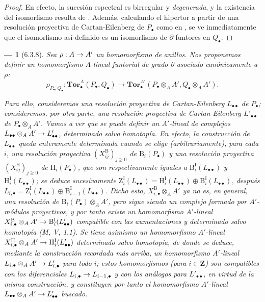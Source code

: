 \documentclass[10pt,oneside,openany]{book}
\theoremstyle{egaenv}\newtheorem*{env}{---}
\theoremstyle{egastatement}
\theoremstyle{egadescription}
\newcommand{\oldpage}[2][]{\marginnote{\normalfont\scriptsize\textbf{#1}\,|\,#2}\ignorespaces}
\renewcommand{\to}{\mathchoice{\longrightarrow}{\rightarrow}{\rightarrow}{\rightarrow}}
\begin{document}
\begin{proof}
En efecto, la sucesión espectral  es birregular y
\emph{degenerada}, y la existencia del isomorfismo  resulta de
. Además,
calculando el hipertor a partir de una resolución proyectiva de
Cartan-Eilenberg de $P_\bullet$ como en , se ve
inmediatamente que el
isomorfismo así definido es un isomorfismo de $\partial$-funtores en
$Q_\bullet$.
\end{proof}
\begin{env}[6.3.8]
\label{III.6.3.8}
\oldpage[III]{144}
Sea $\rho:A\to A'$ un homomorfismo de anillos. Nos proponemos definir un
homomorfismo $A$-lineal funtorial de grado 0 asociado canónicamente a $\rho$:
\[
  \rho_{P_\bullet,Q_\bullet}:
  \mathbf{Tor}_\bullet^A(P_\bullet,Q_\bullet)
  \longrightarrow
  \mathbf{Tor}_\bullet^{A'}
  (P_\bullet\otimes_A A',Q_\bullet\otimes_A A').
  \tag{6.3.8.1}\label{III.6.3.8.1.fr}
\]

Para ello, consideremos una resolución \emph{proyectiva} de Cartan-Eilenberg
$L_{\bullet\bullet}$ de $P_\bullet$; consideremos, por otra parte, una
resolución \emph{proyectiva} de Cartan-Eilenberg $L'_{\bullet\bullet}$ de
$P_\bullet\otimes_A A'$. Vamos a ver que se puede definir un $A'$-lineal de complejos
$L_{\bullet\bullet}\otimes_A A'\to L'_{\bullet\bullet}$, determinado salvo
homotopía. En efecto, la construcción de $L_{\bullet\bullet}$ queda
enteramente determinada cuando se elige (arbitrariamente), para cada $i$,
una resolución proyectiva $(X_{ij}^{\mathrm B})_{j\geqslant0}$ de
$\mathrm B_i(P_\bullet)$ y una resolución proyectiva
$(X_{ij}^{\mathrm H})_{j\geqslant0}$ de $\mathrm H_i(P_\bullet)$, que son
respectivamente iguales a $\mathrm B_i^{\mathrm I}(L_{\bullet\bullet})$ y
$\mathrm H_i^{\mathrm I}(L_{\bullet\bullet})$; se deduce sucesivamente
$\mathrm Z_i^{\mathrm I}(L_{\bullet\bullet})
=\mathrm H_i^{\mathrm I}(L_{\bullet\bullet})
\oplus\mathrm B_i^{\mathrm I}(L_{\bullet\bullet})$, después
$L_{i,\bullet}=\mathrm Z_i^{\mathrm I}(L_{\bullet\bullet})
\oplus\mathrm B_{i-1}^{\mathrm I}(L_{\bullet\bullet})$. Dicho esto, $X_{i,\bullet}^{\mathrm B}\otimes_A A'$ ya no es, en general,
una resolución de $\mathrm B_i(P_\bullet)\otimes_A A'$, pero sigue siendo un
complejo formado por $A'$-módulos \emph{proyectivos}, y por tanto existe un
homomorfismo $A'$-lineal
$X_{i,\bullet}^{\mathrm B}\otimes_A A'
\to\mathrm B_i^{\mathrm I}(L'_{\bullet\bullet})$
compatible con las aumentaciones y determinado salvo homotopía
\emph{(M, V, 1.1)}. Se tiene asimismo un homomorfismo $A'$-lineal
$X_{i,\bullet}^{\mathrm H}\otimes_A A'
\to\mathrm H_i^{\mathrm I}(L'_{\bullet\bullet})$
determinado salvo homotopía, de donde se deduce, mediante la construcción
recordada más arriba, un homomorfismo $A'$-lineal
$L_{i,\bullet}\otimes_A A'\to L'_{i,\bullet}$ para todo $i$; estos
homomorfismos (para $i\in\mathbf Z$) son compatibles con los diferenciales
$L_{i,\bullet}\to L_{i-1,\bullet}$ y con los análogos para
$L'_{\bullet\bullet}$, en virtud de la misma construcción, y constituyen por
tanto el homomorfismo $A'$-lineal
$L_{\bullet\bullet}\otimes_A A'\to L'_{\bullet\bullet}$ buscado.


\end{env}
\end{document}
